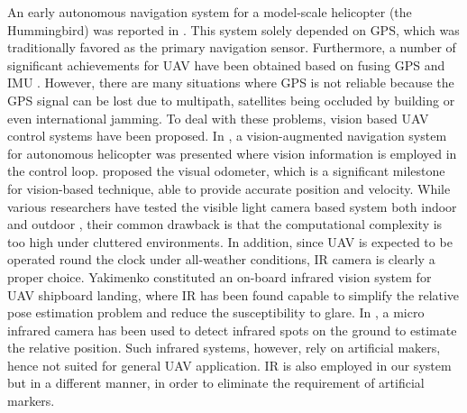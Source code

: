 \documentclass[letterpaper, 10 pt, conference]{ieeeconf}  %
\begin{document}
An early autonomous navigation system for a model-scale helicopter (the Hummingbird) was reported in \cite{Conway:1995}. This system solely depended on GPS, which was traditionally favored as the primary navigation sensor. Furthermore, a number of significant achievements for UAV have been obtained based on fusing GPS and IMU \cite{Templeton2007}\cite{He2010}\cite{Scherer2008}. However, there are many situations where GPS is not reliable because the GPS signal can be lost due to multipath, satellites being occluded by building or even international jamming. To deal with these problems, vision based UAV control systems have been proposed. In \cite{bosse1997vision}, a vision-augmented navigation system for autonomous helicopter was presented where vision information is employed in the control loop. \cite{Amidi1999} proposed the visual odometer, which is a significant milestone for vision-based technique, able to provide accurate position and velocity. While various researchers have tested the visible light 
camera based system both indoor \cite{MATSUE2005}\cite{Bouabdallah2005} and outdoor \cite{Saripalli2003a}\cite{1331783}\cite{Saripalli2003}, their common drawback is that the computational complexity is too high under cluttered environments. In addition, since UAV is expected to be operated round the clock under all-weather conditions, IR camera is clearly a proper choice. Yakimenko\cite{Yakimenko2002} constituted  an on-board infrared vision system for UAV shipboard landing, where IR has  been found capable to simplify the relative pose estimation problem and reduce the susceptibility to glare. In \cite{Wenzel2010}, a micro infrared camera has been used to detect infrared spots on the ground to estimate the relative position. Such infrared systems, however, rely on artificial makers, hence not suited for general UAV application. IR is also employed in our system  but in a different manner, in order to eliminate the requirement of artificial markers.
\end{document}
